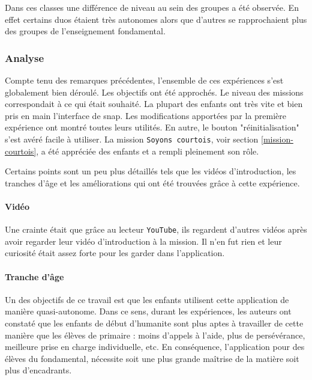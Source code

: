 Dans ces classes une différence de niveau au sein des groupes a été observée. En effet certains duos étaient très autonomes alors que d'autres se rapprochaient plus des groupes de l'enseignement \gls{fondamental}.

\subsubsection{Analyse}
\label{analyse-scienceinfuse}
Compte tenu des remarques précédentes, l'ensemble de ces expériences s'est globalement bien déroulé. Les objectifs ont été approchés. Le niveau des \glspl{mission} correspondait à ce qui était souhaité. La plupart des enfants ont très vite et bien pris en main l'interface de \gls{snap}. Les modifications apportées par la première expérience ont montré toutes leurs utilités. En autre, le bouton "réinitialisation" s'est avéré facile à utiliser. La \gls{mission} \texttt{Soyons courtois}, voir section \ref{mission-courtois}, a été appréciée des enfants et a rempli pleinement son rôle.

Certains points sont un peu plus détaillés tels que les vidéos d'introduction, les tranches d'âge et les améliorations qui ont été trouvées grâce à cette expérience.

\paragraph{Vidéo}
Une crainte était que grâce au lecteur \texttt{YouTube}, ils regardent d'autres vidéos après avoir regarder leur vidéo d'introduction à la \gls{mission}. Il n'en fut rien et leur curiosité était assez forte pour les garder dans l'application.

\paragraph{Tranche d'âge}
\label{trancheage}
Un des objectifs de ce travail est que les enfants utilisent cette application de manière quasi-autonome. Dans ce sens, durant les expériences, les auteurs ont constaté que les enfants de début d'\gls{humanite} sont plus aptes à travailler de cette manière que les élèves de \gls{primaire} : moins d'appels à l'aide, plus de persévérance, meilleure prise en charge individuelle, etc.
En conséquence, l'application pour des élèves du \gls{fondamental}, nécessite soit une plus grande maîtrise de la matière soit plus d'encadrants.


